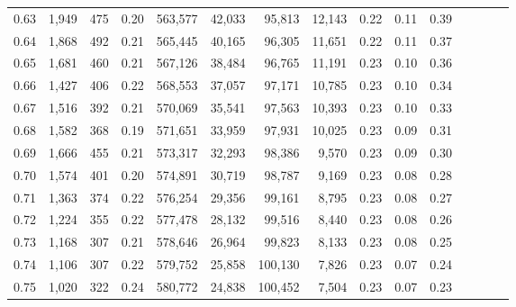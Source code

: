 \begin{tabular}{rrrcrrrrrrrrrrr}
0.63 &   1,949 &     475 &                                       0.20 &  563,577 &   42,033 &   95,813 &   12,143 &  0.22 &  0.11 &                         0.39 \\
0.64 &   1,868 &     492 &                                       0.21 &  565,445 &   40,165 &   96,305 &   11,651 &  0.22 &  0.11 &                         0.37 \\
0.65 &   1,681 &     460 &                                       0.21 &  567,126 &   38,484 &   96,765 &   11,191 &  0.23 &  0.10 &                         0.36 \\
0.66 &   1,427 &     406 &                                       0.22 &  568,553 &   37,057 &   97,171 &   10,785 &  0.23 &  0.10 &                         0.34 \\
0.67 &   1,516 &     392 &                                       0.21 &  570,069 &   35,541 &   97,563 &   10,393 &  0.23 &  0.10 &                         0.33 \\
0.68 &   1,582 &     368 &                                       0.19 &  571,651 &   33,959 &   97,931 &   10,025 &  0.23 &  0.09 &                         0.31 \\
0.69 &   1,666 &     455 &                                       0.21 &  573,317 &   32,293 &   98,386 &    9,570 &  0.23 &  0.09 &                         0.30 \\
0.70 &   1,574 &     401 &                                       0.20 &  574,891 &   30,719 &   98,787 &    9,169 &  0.23 &  0.08 &                         0.28 \\
0.71 &   1,363 &     374 &                                       0.22 &  576,254 &   29,356 &   99,161 &    8,795 &  0.23 &  0.08 &                         0.27 \\
0.72 &   1,224 &     355 &                                       0.22 &  577,478 &   28,132 &   99,516 &    8,440 &  0.23 &  0.08 &                         0.26 \\
0.73 &   1,168 &     307 &                                       0.21 &  578,646 &   26,964 &   99,823 &    8,133 &  0.23 &  0.08 &                         0.25 \\
0.74 &   1,106 &     307 &                                       0.22 &  579,752 &   25,858 &  100,130 &    7,826 &  0.23 &  0.07 &                         0.24 \\
0.75 &   1,020 &     322 &                                       0.24 &  580,772 &   24,838 &  100,452 &    7,504 &  0.23 &  0.07 &                         0.23 \\

\end{tabular}
